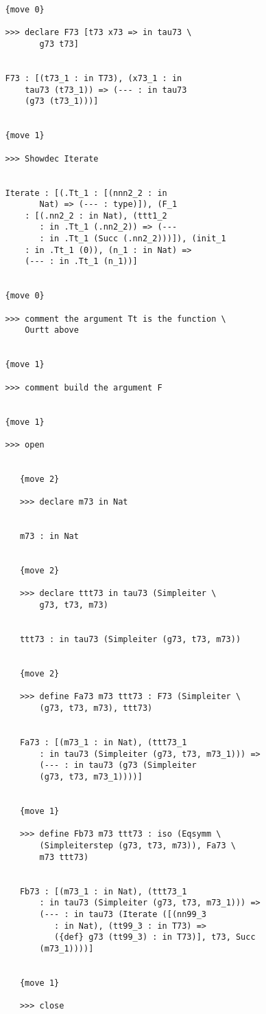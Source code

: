 \documentclass[12pt]{article}
\begin{document}
\begin{verbatim}
   {move 0}

   >>> declare F73 [t73 x73 => in tau73 \
          g73 t73]


   F73 : [(t73_1 : in T73), (x73_1 : in 
       tau73 (t73_1)) => (--- : in tau73 
       (g73 (t73_1)))]


   {move 1}

   >>> Showdec Iterate


   Iterate : [(.Tt_1 : [(nnn2_2 : in 
          Nat) => (--- : type)]), (F_1 
       : [(.nn2_2 : in Nat), (ttt1_2 
          : in .Tt_1 (.nn2_2)) => (--- 
          : in .Tt_1 (Succ (.nn2_2)))]), (init_1 
       : in .Tt_1 (0)), (n_1 : in Nat) => 
       (--- : in .Tt_1 (n_1))]


   {move 0}

   >>> comment the argument Tt is the function \
       Ourtt above


   {move 1}

   >>> comment build the argument F


   {move 1}

   >>> open


      {move 2}

      >>> declare m73 in Nat


      m73 : in Nat


      {move 2}

      >>> declare ttt73 in tau73 (Simpleiter \
          g73, t73, m73)


      ttt73 : in tau73 (Simpleiter (g73, t73, m73))


      {move 2}

      >>> define Fa73 m73 ttt73 : F73 (Simpleiter \
          (g73, t73, m73), ttt73)


      Fa73 : [(m73_1 : in Nat), (ttt73_1 
          : in tau73 (Simpleiter (g73, t73, m73_1))) => 
          (--- : in tau73 (g73 (Simpleiter 
          (g73, t73, m73_1))))]


      {move 1}

      >>> define Fb73 m73 ttt73 : iso (Eqsymm \
          (Simpleiterstep (g73, t73, m73)), Fa73 \
          m73 ttt73)


      Fb73 : [(m73_1 : in Nat), (ttt73_1 
          : in tau73 (Simpleiter (g73, t73, m73_1))) => 
          (--- : in tau73 (Iterate ([(nn99_3 
             : in Nat), (tt99_3 : in T73) => 
             ({def} g73 (tt99_3) : in T73)], t73, Succ 
          (m73_1))))]


      {move 1}

      >>> close



\end{verbatim}
\end{document}
